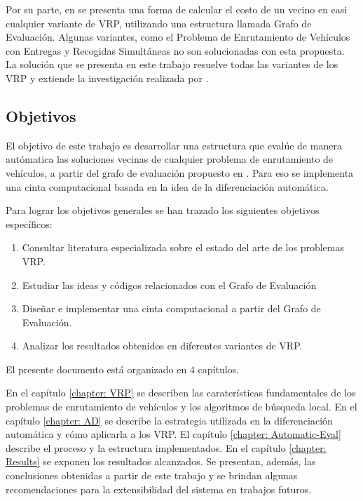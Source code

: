 Por su parte, en \cite{JJ} se presenta una forma de calcular el costo de un vecino en casi cualquier variante de VRP, utilizando una estructura llamada Grafo de Evaluación. Algunas variantes, como el Problema de Enrutamiento de Vehículos con Entregas y Recogidas Simultáneas no son solucionadas con esta propuesta. La solución que se presenta en este trabajo resuelve todas las variantes de los VRP y extiende la investigación realizada por \cite{JJ}. 

\subsection*{Objetivos}
El objetivo de este trabajo es desarrollar una estructura que evalúe de manera autómatica las soluciones vecinas de cualquier problema de enrutamiento de vehículos, a partir del grafo de evaluación propuesto en \cite{JJ}. Para eso se implementa una cinta computacional basada en la idea de la diferenciación automática.

Para lograr los objetivos generales se han trazado los siguientes objetivos específicos:

\begin{enumerate}
	\item Consultar literatura especializada sobre el estado del arte de los problemas VRP.
	\item Estudiar las ideas y códigos relacionados con el Grafo de Evaluación \cite{JJ}
	\item Diseñar e implementar una cinta computacional a partir del Grafo de Evaluación.	
	\item Analizar los resultados obtenidos en diferentes variantes de VRP.
\end{enumerate}

El presente documento está organizado en 4 capítulos.

En el capítulo \ref{chapter: VRP} se describen las caraterísticas fundamentales de los problemas de enrutamiento de vehículos y los algoritmos de búsqueda local. En el capítulo \ref{chapter: AD} se describe la estrategia utilizada en la diferenciación automática y cómo aplicarla a los VRP. El capítulo \ref{chapter: Automatic-Eval} describe el proceso y la estructura implementados. En el capítulo \ref{chapter: Results} se exponen los resultados alcanzados. Se presentan, además, las conclusiones obtenidas a partir de este trabajo y se brindan algunas recomendaciones para la extensibilidad del sistema en trabajos futuros.





